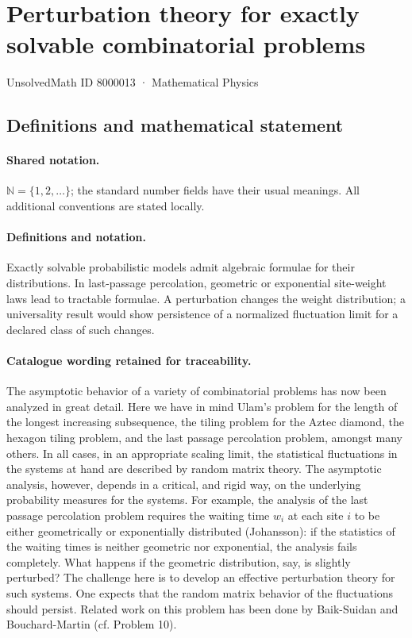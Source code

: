 \documentclass[11pt]{article}
\begin{document}
\setcounter{section}{8000012}
\section{Perturbation theory for exactly solvable combinatorial problems}\label{8000013}
{\small UnsolvedMath ID 8000013 · Mathematical Physics}
\subsection{Definitions and mathematical statement}

\paragraph{Shared notation.}$\mathbb N=\{1,2,\ldots\}$; the standard number fields have their usual meanings. All additional conventions are stated locally.


\paragraph{Definitions and notation.}Exactly solvable probabilistic models admit algebraic formulae for their distributions. In last-passage percolation, geometric or exponential site-weight laws lead to tractable formulae. A perturbation changes the weight distribution; a universality result would show persistence of a normalized fluctuation limit for a declared class of such changes.

\paragraph{Catalogue wording retained for traceability.}
The asymptotic behavior of a variety of combinatorial problems has now been analyzed in great detail. Here we have in mind Ulam's problem for the length of the longest increasing subsequence, the tiling problem for the Aztec diamond, the hexagon tiling problem, and the last passage percolation problem, amongst many others. In all cases, in an appropriate scaling limit, the statistical fluctuations in the systems at hand are described by random matrix theory. The asymptotic analysis, however, depends in a critical, and rigid way, on the underlying probability measures for the systems. For example, the analysis of the last passage percolation problem requires the waiting time $w_i$ at each site $i$ to be either geometrically or exponentially distributed (Johansson): if the statistics of the waiting times is neither geometric nor exponential, the analysis fails completely. What happens if the geometric distribution, say, is slightly perturbed? The challenge here is to develop an effective perturbation theory for such systems. One expects that the random matrix behavior of the fluctuations should persist. Related work on this problem has been done by Baik-Suidan and Bouchard-Martin (cf. Problem 10).
\end{document}
